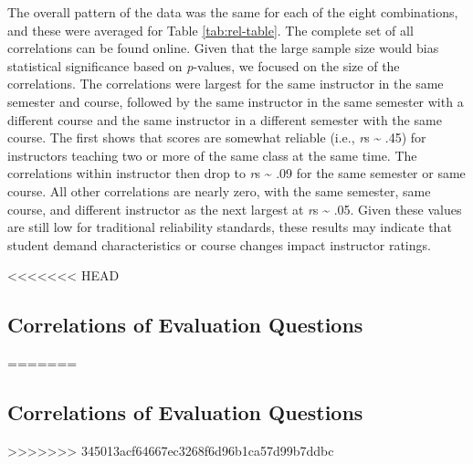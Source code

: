 \documentclass[man]{apa6}
\theoremstyle{definition}
\theoremstyle{definition}
\theoremstyle{definition}
\theoremstyle{remark}
\begin{document}
The overall pattern of the data was the same for each of the eight combinations, and these were averaged for Table \ref{tab:rel-table}. The complete set of all correlations can be found online. Given that the large sample size would bias statistical significance based on \emph{p}-values, we focused on the size of the correlations. The correlations were largest for the same instructor in the same semester and course, followed by the same instructor in the same semester with a different course and the same instructor in a different semester with the same course. The first shows that scores are somewhat reliable (i.e., \emph{r}s \textasciitilde{} .45) for instructors teaching two or more of the same class at the same time. The correlations within instructor then drop to \emph{r}s \textasciitilde{} .09 for the same semester or same course. All other correlations are nearly zero, with the same semester, same course, and different instructor as the next largest at \emph{r}s \textasciitilde{} .05. Given these values are still low for traditional reliability standards, these results may indicate that student demand characteristics or course changes impact instructor ratings.

<<<<<<< HEAD
\subsection{Correlations of Evaluation
Questions}\label{correlations-of-evaluation-questions}
=======
\hypertarget{correlations-of-evaluation-questions}{%
\subsection{Correlations of Evaluation Questions}\label{correlations-of-evaluation-questions}}
>>>>>>> 345013acf64667ec3268f6d96b1ca57d99b7ddbc
\end{document}
